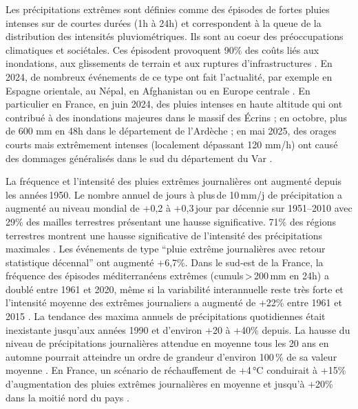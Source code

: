 \documentclass[
  article,
  nofooter,
  noheadings]{jss}
\begin{document}
Les précipitations extrêmes sont définies comme des épisodes de fortes
pluies intenses sur de courtes durées (1h à 24h) et correspondent à la
queue de la distribution des intensités pluviométriques. Ils sont au
coeur des préoccupations climatiques et sociétales. Ces épisodent
provoquent 90\% des coûts liés aux inondations, aux glissements de
terrain et aux ruptures d'infrastructures \citep{IPCC_2022_WGIII}. En
2024, de nombreux événements de ce type ont fait l'actualité, par
exemple en Espagne orientale, au Népal, en Afghanistan ou en Europe
centrale \citep{WMO2025}. En particulier en France, en juin 2024, des
pluies intenses en haute altitude qui ont contribué à des inondations
majeures dans le massif des Écrins \citep{Blanc2024} ; en octobre, plus
de 600 mm en 48h dans le département de l'Ardèche
\citep{MeteoFrance2024_episodesArdeches} ; en mai 2025, des orages
courts mais extrêmement intenses (localement dépassant 120 mm/h) ont
causé des dommages généralisés dans le sud du département du Var
\citep{MeteoFrance2025}.

La fréquence et l'intensité des pluies extrêmes journalières ont
augmenté depuis les années\,1950. Le nombre annuel de jours à plus\,de
10\,mm/j de précipitation a augmenté au niveau mondial de +0,2 à
+0,3\,jour par décennie sur 1951--2010 \citep{Donat2013} avec 29\% des
mailles terrestres présentant une hausse significative. 71\% des régions
terrestres montrent une hausse significative de l'intensité des
précipitations maximales \citep{IPCC2021}. Les événements de type
``pluie extrême journalières avec retour statistique décennal'' ont
augmenté +6,7\%. Dans le sud‑est de la France, la fréquence des épisodes
méditerranéens extrêmes (cumuls\,\textgreater\,200\,mm en 24h) a doublé
entre 1961 et 2020, même si la variabilité interannuelle reste très
forte \citep{meteofrance2024_episodesMediterraneens} et l'intensité
moyenne des extrêmes journaliers a augmenté de +22\% entre 1961 et 2015
\citep{Ribes2019}. La tendance des maxima annuels de précipitations
quotidiennes était inexistante jusqu'aux années 1990 et d'environ +20 à
+40\% depuis. La hausse du niveau de précipitations journalières
attendue en moyenne tous les 20 ans en automne pourrait atteindre un
ordre de grandeur d'environ 100\,\% de sa valeur moyenne
\citep{blanchet2021explaining}. En France, un scénario de réchauffement
de +4\,°C conduirait à +15\% d'augmentation des pluies extrêmes
journalières en moyenne et jusqu'à +20\% dans la moitié nord du pays
\citep{soubeyroux:hal-04991790}.
\end{document}
